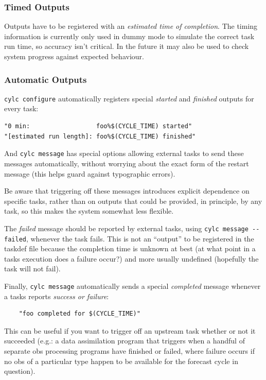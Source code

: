 \documentclass[11pt,a4paper]{article}
\begin{document}
\pagebreak

\subsubsection{Timed Outputs}

Outputs have to be registered with an {\em estimated time of completion}.
The timing information is currently only used in dummy mode to simulate
the correct task run time, so accuracy isn't critical. In the future
it may also be used to check system progress against expected behaviour.

\subsubsection{Automatic Outputs}

\lstinline=cylc configure= automatically registers special {\em started}
and {\em finished} outputs for every task: 

\begin{lstlisting}
"0 min:                  foo%$(CYCLE_TIME) started"
"[estimated run length]: foo%$(CYCLE_TIME) finished"
\end{lstlisting}

And \lstinline=cylc message= has special options allowing external
tasks to send these messages automatically, without worrying about the
exact form of the restart message (this helps guard against typographic
errors).

Be aware that triggering off these messages introduces explicit
dependence on specific tasks, rather than on outputs that could be
provided, in principle, by any task, so this makes the system somewhat
less flexible.


The {\em failed} message should be reported by external tasks, using 
\lstinline=cylc message --failed=, whenever the task fails. This is 
not an ``output'' to be registered in the taskdef file because the
completion time is unknown at best (at what point in a tasks execution
does a failure occur?) and more usually undefined (hopefully the task
will not fail). 

Finally, \lstinline=cylc message= automatically sends a special {\em
completed} message whenever a tasks reports {\em success or failure}:
\begin{lstlisting}
    "foo completed for $(CYCLE_TIME)"
\end{lstlisting}
 
This can be useful if you want to trigger off an upstream task whether
or not it succeeded (e.g.: a data assimilation program that triggers
when a handful of separate obs processing programs have finished or
failed, where failure occurs if no obs of a particular type happen to be
available for the forecast cycle in question).
\end{document}
